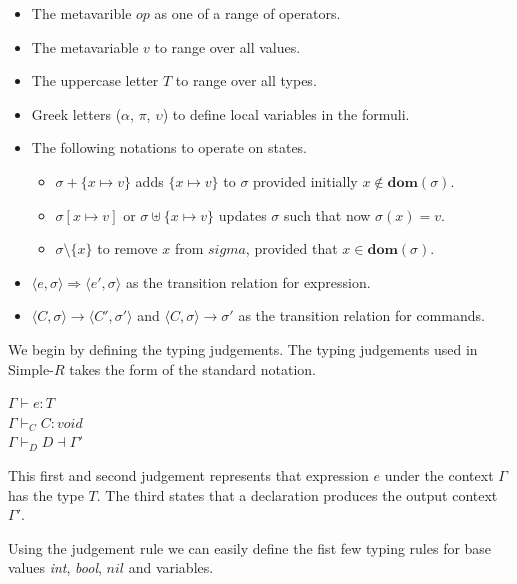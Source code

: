 \documentclass[a4paper,12pt]{report}
\begin{document}
\renewcommand\labelitemii{$\blacksquare$}
\begin{itemize}
  \item The metavarible $op$ as one of a range of operators. 
  \item The metavariable $v$ to range over all values.
  \item The uppercase letter $T$ to range over all types.
  \item Greek letters ($\alpha$, $\pi$, $\upsilon$) to define local variables in 
  the formuli. 
  \item The following notations to operate on states. 
    \begin{itemize}
      \item $\sigma + \{x \mapsto v\}$ adds $\{x \mapsto v\}$ to $\sigma$ provided initially $x \notin\textbf{dom}(\sigma)$. 
      \item $\sigma[x \mapsto v]$ or $\sigma \uplus \{x \mapsto v\}$ updates $\sigma$ such that now $\sigma(x) = v$.
      \item $\sigma \setminus \{x\}$ to remove $x$ from $sigma$, provided that $x \in \textbf{dom}(\sigma)$.
    \end{itemize}
  \item $\langle e, \sigma \rangle \Longrightarrow \langle e', \sigma \rangle$ as the transition relation for expression.
  \item $\langle C, \sigma \rangle \longrightarrow \langle C', \sigma' \rangle$ and $\langle C, \sigma \rangle \longrightarrow \sigma'$ as the transition relation for commands.
\end{itemize}

\par
We begin by defining the typing judgements. The typing judgements used in 
Simple-$R$ takes the form of the standard notation. 
\begin{center}
  $\Gamma \vdash e : T$\\
  $\Gamma \vdash_{C} C : void$\\
  $\Gamma \vdash_{D} D \dashv \Gamma'$\\
\end{center}
This first and second judgement represents that expression $e$ 
under the context $\Gamma$ has the type $T$. The third states that a declaration 
produces the output context $\Gamma'$.

\par
Using the judgement rule we can easily define the fist few typing rules for base 
values \textit{int}, \textit{bool}, $nil$ and variables.
\end{document}

